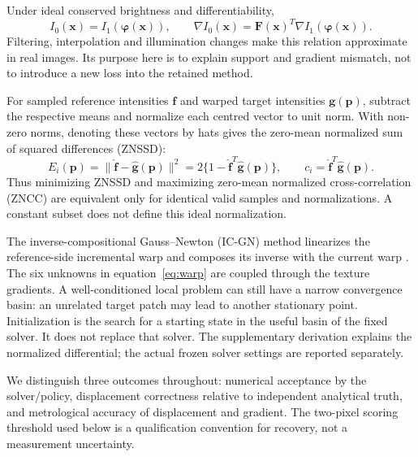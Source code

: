 Under ideal conserved brightness and differentiability,
\begin{equation}
I_0(\mathbf x)=I_1(\boldsymbol\varphi(\mathbf x)),\qquad
\nabla I_0(\mathbf x)=\mathbf F(\mathbf x)^T\nabla I_1(\boldsymbol\varphi(\mathbf x)).
\label{eq:advection}
\end{equation}
Filtering, interpolation and illumination changes make this relation approximate in real images. Its purpose here is to explain support and gradient mismatch, not to introduce a new loss into the retained method.

For sampled reference intensities $\mathbf f$ and warped target intensities $\mathbf g(\mathbf p)$, subtract the respective means and normalize each centred vector to unit norm. With non-zero norms, denoting these vectors by hats gives the zero-mean normalized sum of squared differences (ZNSSD):
\begin{equation}
E_i(\mathbf p)=\|\widehat{\mathbf f}-\widehat{\mathbf g}(\mathbf p)\|^2
=2\{1-\widehat{\mathbf f}^T\widehat{\mathbf g}(\mathbf p)\},\qquad
c_i=\widehat{\mathbf f}^T\widehat{\mathbf g}(\mathbf p).
\label{eq:znssd}
\end{equation}
Thus minimizing ZNSSD and maximizing zero-mean normalized cross-correlation (ZNCC) are equivalent only for identical valid samples and normalizations. A constant subset does not define this ideal normalization.

The inverse-compositional Gauss--Newton (IC-GN) method linearizes the reference-side incremental warp and composes its inverse with the current warp \citep{baker,panfast}. The six unknowns in equation~\eqref{eq:warp} are coupled through the texture gradients. A well-conditioned local problem can still have a narrow convergence basin: an unrelated target patch may lead to another stationary point. Initialization is the search for a starting state in the useful basin of the fixed solver. It does not replace that solver. The supplementary derivation explains the normalized differential; the actual frozen solver settings are reported separately.

We distinguish three outcomes throughout: numerical acceptance by the solver/policy, displacement correctness relative to independent analytical truth, and metrological accuracy of displacement and gradient. The two-pixel scoring threshold used below is a qualification convention for recovery, not a measurement uncertainty.
